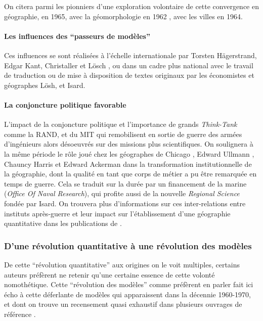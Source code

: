 On citera parmi les pionniers d'une exploration volontaire de cette convergence en géographie, \textcite{Haggett1965} en 1965, \textcite{Chorley1962} avec la géomorphologie en 1962 , \textcite{Berry1964a} avec les villes en 1964.

\paragraph{Les influences des \enquote{passeurs de modèles}}

Ces influences se sont réalisées à l'échelle internationale par Torsten Hägerstrand, Edgar Kant, Christaller et Lösch \autocite[119]{Berry1970}, ou dans un cadre plus national avec le travail de traduction ou de mise à disposition de textes originaux par les économistes et géographes Lösh, et Isard.

\paragraph{La conjoncture politique favorable}
L'impact de la conjoncture politique et l'importance de grands \textit{Think-Tank} comme la RAND, et du MIT qui remobilisent en sortie de guerre des armées d'ingénieurs alors désoeuvrés sur des missions plus scientifiques. On soulignera à la même période le rôle joué chez les géographes de Chicago \autocite{Harris1979}, Edward Ullmann \autocites{Ullman1941, Harris1977, Glick1988}, Chauncy Harris \autocite{Harris1945, Lichtenberger2005} et Edward Ackerman \autocites{Ackerman1958, Ackerman1963} dans la transformation institutionnelle de la géographie, dont la qualité en tant que corps de métier a pu être remarquée en temps de guerre. Cela se traduit sur la durée par un financement de la marine (\textit{Office Of Naval Research}), qui profite aussi de la nouvelle \textit{Regional Science} fondée par Isard. On trouvera plus d'informations sur ces inter-relations entre instituts après-guerre et leur impact sur l'établissement d'une géographie quantitative dans les publications de \textcites{Barnes2006a, Barnes2008}.

\subsubsection{D'une révolution quantitative à une révolution des modèles}
\label{ssec:revol_modele}

De cette \enquote{révolution quantitative} aux origines on le voit multiples, certains auteurs préfèrent ne retenir qu'une certaine essence de cette volonté nomothétique. Cette \enquote{révolution des modèles} comme préfèrent en parler \textcite{Wilson1970, Varenne2014} fait ici écho à cette déferlante de modèles qui apparaissent dans la décennie 1960-1970, et dont on trouve un recensement quasi exhaustif dans plusieurs ouvrages de référence \autocite{Haggett1965,Chorley1967}.

